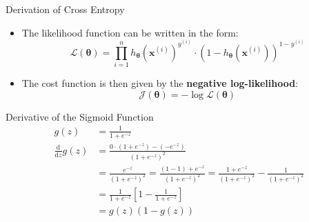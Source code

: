 \begin{frame}{Derivation of Cross Entropy}{}\optional
	\begin{itemize}
		\item The likelihood function can be written in the form:
		\begin{equation}
			\mathcal{L}(\bm{\theta}) = \prod_{i=1}^n h_{\bm{\theta}}(\bm{x}^{(i)})^{y^{(i)}} \cdot (1 - h_{\bm{\theta}}(\bm{x}^{(i)}))^{1 - y^{(i)}}
		\end{equation}
		\item The cost function is then given by the \textbf{negative log-likelihood}:
		\begin{equation}
			\mathcal{J}(\bm{\theta}) = -\log \mathcal{L}(\bm{\theta})
		\end{equation}
	\end{itemize}
\end{frame}


\begin{frame}{Derivative of the Sigmoid Function}{}\optional
	\footnotesize
	\begin{align*}
		g(z) 
			&= 	\frac{1}{1 + e^{-z}} \\[4mm]
		\frac{\text{d}}{\text{d}z} g(z) 
			&= 	\frac{0 \cdot (1 + e^{-z}) - (-e^{-z})}{(1 + e^{-z})^2} \\[2mm]
			&= 	\frac{e^{-z}}{(1 + e^{-z})^2} = \frac{(1 - 1) + e^{-z}}{(1 + e^{-z})^2} =
				\frac{1 + e^{-z}}{(1 + e^{-z})^2} - \frac{1}{(1 + e^{-z})^2} \\[2mm]
			&= 	\frac{1}{1 + e^{-z}} \left[ 1 - \frac{1}{1 + e^{-z}} \right] \\[2mm]
			&=	\boxed{g(z) (1 - g(z))}
	\end{align*}
\end{frame}



